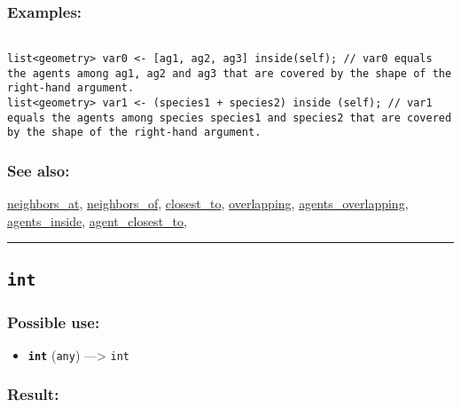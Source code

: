 \documentclass[]{book}
\providecommand{\tightlist}{%
  \setlength{\itemsep}{0pt}\setlength{\parskip}{0pt}}
\theoremstyle{definition}
\theoremstyle{definition}
\theoremstyle{definition}
\theoremstyle{remark}
\begin{document}
\subsubsection{Examples:}\label{examples-209}

\begin{verbatim}
 
list<geometry> var0 <- [ag1, ag2, ag3] inside(self); // var0 equals the agents among ag1, ag2 and ag3 that are covered by the shape of the right-hand argument. 
list<geometry> var1 <- (species1 + species2) inside (self); // var1 equals the agents among species species1 and species2 that are covered by the shape of the right-hand argument.
\end{verbatim}

\subsubsection{See also:}\label{see-also-118}

\href{OperatorsNR\#neighbors_at}{neighbors\_at},
\href{OperatorsNR\#neighbors_of}{neighbors\_of},
\href{OperatorsBC\#closest_to}{closest\_to},
\href{OperatorsNR\#overlapping}{overlapping},
\href{OperatorsAA\#agents_overlapping}{agents\_overlapping},
\href{OperatorsAA\#agents_inside}{agents\_inside},
\href{OperatorsAA\#agent_closest_to}{agent\_closest\_to},

\begin{center}\rule{0.5\linewidth}{\linethickness}\end{center}

\subsection{\texorpdfstring{\texttt{int}}{int}}\label{int}

\subsubsection{Possible use:}\label{possible-use-276}

\begin{itemize}
\tightlist
\item
  \textbf{\texttt{int}} (\texttt{any}) ---\textgreater{} \texttt{int}
\end{itemize}

\subsubsection{Result:}\label{result-266}
\end{document}
